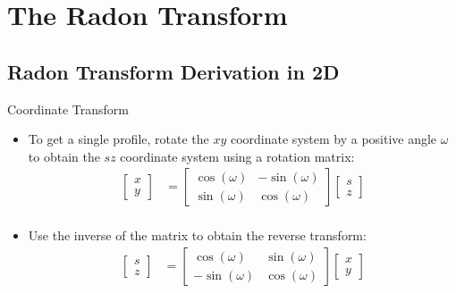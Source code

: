 \documentclass{beamer}
\begin{document}
\section{The Radon Transform}
\subsection{Radon Transform Derivation in 2D}

\begin{frame}{Coordinate Transform}
\begin{itemize}
    \item
        To get a single profile, rotate the $xy$ coordinate system by a positive angle $\omega$ to obtain the $sz$ coordinate system using a rotation matrix:
        \begin{align*}
            \begin{bmatrix}
                x \\
                y
            \end{bmatrix}
            & = 
            \begin{bmatrix}
                \cos (\omega) & -\sin (\omega) \\
                \sin (\omega) & \cos (\omega)
            \end{bmatrix}
            \begin{bmatrix}
                s \\
                z
            \end{bmatrix} \\
        \end{align*}
    \pause
    \item
        Use the inverse of the matrix to obtain the reverse transform:
        \begin{align*}
            \begin{bmatrix}
                s \\
                z
            \end{bmatrix}
            & = 
            \begin{bmatrix}
                \cos (\omega) & \sin (\omega) \\
                 -\sin (\omega) & \cos (\omega)
            \end{bmatrix}
            \begin{bmatrix}
                x \\
                y
            \end{bmatrix}
        \end{align*}
\end{itemize}
\end{frame}
\end{document}
